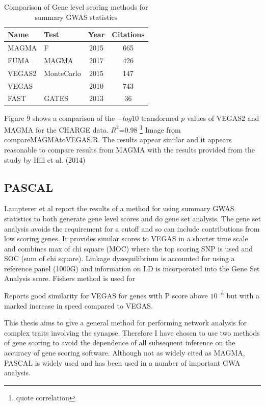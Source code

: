 \begin{table}[h]
    \centering
    \begin{tabular}{llcc}
    \toprule
    Name     & Test & Year & Citations \\
    \midrule
    MAGMA     & F & 2015 & 665\cite{de2015magma} \\ 
    FUMA & MAGMA & 2017 & 426 \cite{watanabe2017functional}\\
    VEGAS2 & MonteCarlo & 2015 & 147 \cite{mishra2015vegas2}\\
    VEGAS & & 2010 & 743  \cite{liu2010versatile} \\
    FAST & GATES & 2013 & 36 \cite{chanda2013fast} \\
    \bottomrule
    \end{tabular}
    \caption{Comparison of Gene level scoring methods for summary GWAS statistics}
    \label{tab:gene_tests}
\end{table}
Figure 9 shows a comparison of the $-log10$ transformed $p$ values of VEGAS2 and MAGMA for the CHARGE data. $R^2$=0.98 \footnote{quote correlation} Image from compareMAGMAtoVEGAS.R. The results appear similar and it appears reasonable to compare results from MAGMA with the results provided from the study by Hill et al. (2014)
\subsection{PASCAL}
Lampterer et al \cite{lamparter2016fast} report the results of a method for using summary GWAS statistics to both generate gene level scores and do gene set analysis. The gene set analysis avoids the requirement for a cutoff and so can include contributions from low scoring genes. It provides similar scores to VEGAS in a shorter time scale and combines max of chi square (MOC) where the top scoring SNP is used and SOC (sum of chi square). Linkage dysequilibrium is accounted for using a reference panel (1000G) and information on LD is incorporated into the Gene Set Analysis score. Fishers method is used for 

Reports good similarity for VEGAS for genes with P score above $10^{-6}$ but with a marked increase in speed compared to VEGAS.

This thesis aims to give a general method for performing network analysis for complex traits involving the synapse. Therefore I have chosen to use two methods of gene scoring to avoid the dependence of all subsequent inference on the accuracy of gene scoring software. Although not as widely cited as MAGMA, PASCAL is widely used and has been used in a number of important GWA analysis.   

